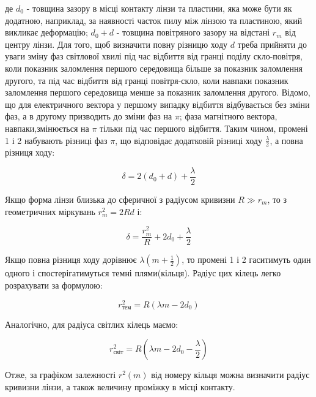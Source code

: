 де $d_0$ - товщина зазору в місці контакту лінзи та пластини, яка може бути як
додатною, наприклад, за наявності часток пилу між лінзою та пластиною, який
викликає деформацію; $d_0 + d$ - товщина повітряного зазору на відстані $r_m$ від
центру лінзи. Для того, щоб визначити повну різницю ходу $d$ треба прийняти до
уваги зміну фаз світлової хвилі під час відбиття від гранці поділу скло-повітря,
коли показник заломлення першого середовища більше за показник заломлення
другого, та під час відбиття від гранці повітря-скло, коли навпаки показник
заломлення першого середовища менше за показник заломлення другого. Відомо,
що для електричного вектора у першому випадку відбиття відбувається без
зміни фаз, а в другому призводить до зміни фаз на $\pi$; фаза магнітного вектора,
навпаки,змінюється на $\pi$ тільки під час першого відбиття. Таким чином, промені
1 і 2 набувають різниці фаз $\pi$, що відповідає додатковій різниці ходу $\frac{\lambda}{2}$,
а повна різниця ходу:

\begin{equation} \label{eq:2}
    \delta = 2(d_0 + d) + \frac{\lambda}{2}
\end{equation}


Якщо форма лінзи близька до сферичної з радіусом кривизни $R \gg r_m$,
то з геометричних міркувань $ r^2_{m} = 2Rd $ і:

\begin{equation} \label{eq:3}
    \delta = \frac{r^2_m}{R} + 2d_0 + \frac{\lambda}{2}
\end{equation}

Якщо повна різниця ходу дорівнює $ \lambda \left( m + \frac{1}{2} \right) $,
то промені 1 і 2 гаситимуть один одного і спостерігатимуться
темні плями(кільця). Радіус цих кілець легко розрахувати за формулою:

\begin{equation} \label{eq:4}
    r^2_{тем} = R(\lambda m - 2d_0)
\end{equation}

Аналогічно, для радіуса світлих кілець маємо:

\begin{equation} \label{eq:5}
    r^2_{світ} = R(\lambda m - 2d_0 - \frac{\lambda}{2})
\end{equation}

Отже, за графіком залежності $r^2(m)$ від номеру кільця можна визначити
радіус кривизни лінзи, а також величину проміжку в місці контакту.
